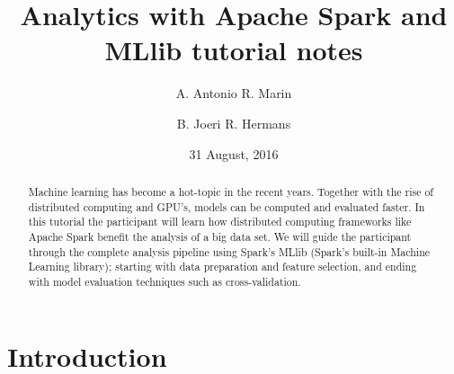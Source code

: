 \documentclass[%
 aip,
 jmp,%
 amsmath,amssymb,
 reprint,%
]{revtex4-1}
\begin{document}

\title[Analytics with Apache Spark and MLlib tutorial notes]{Analytics with Apache Spark and MLlib tutorial notes}%

\author{A. Antonio R. Marin}%
\author{B. Joeri R. Hermans}

\date{31 August, 2016}

\begin{abstract}
  Machine learning has become a hot-topic in the recent years. Together with the rise of distributed computing and GPU's, models can be computed and evaluated faster. In this tutorial the participant will learn how distributed computing frameworks like Apache Spark benefit the analysis of a big data set. We will guide the participant through the complete analysis pipeline using Spark's MLlib (Spark's built-in Machine Learning library); starting with data preparation and feature selection, and ending with model evaluation techniques such as cross-validation.
\end{abstract}
\maketitle

\section{Introduction}
\label{sec:introduction}
\end{document}
